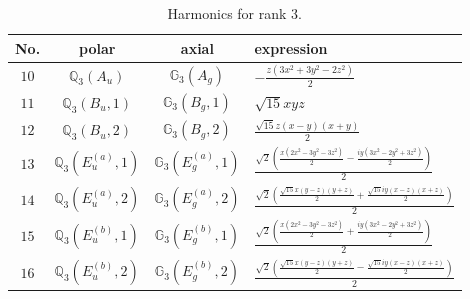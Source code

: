 \documentclass[fleqn,8pt,landscape]{jsarticle}
\begin{document}
\begin{table}[ht!]
\begin{center}
\caption{Harmonics for rank 3.}
\renewcommand{\arraystretch}{1.3}
\begin{tabular}{cccl} \hline \hline
No. & polar & axial & expression \\ \hline
$ 10 $ & $ \mathbb{Q}_{3}(A_{u}) $ & $ \mathbb{G}_{3}(A_{g}) $ & $ - \frac{z \left(3 x^{2} + 3 y^{2} - 2 z^{2}\right)}{2} $ \\
$ 11 $ & $ \mathbb{Q}_{3}(B_{u},1) $ & $ \mathbb{G}_{3}(B_{g},1) $ & $ \sqrt{15} x y z $ \\
$ 12 $ & $ \mathbb{Q}_{3}(B_{u},2) $ & $ \mathbb{G}_{3}(B_{g},2) $ & $ \frac{\sqrt{15} z \left(x - y\right) \left(x + y\right)}{2} $ \\
$ 13 $ & $ \mathbb{Q}_{3}(E_{u}^{(a)},1) $ & $ \mathbb{G}_{3}(E_{g}^{(a)},1) $ & $ \frac{\sqrt{2} \left(\frac{x \left(2 x^{2} - 3 y^{2} - 3 z^{2}\right)}{2} - \frac{i y \left(3 x^{2} - 2 y^{2} + 3 z^{2}\right)}{2}\right)}{2} $ \\
$ 14 $ & $ \mathbb{Q}_{3}(E_{u}^{(a)},2) $ & $ \mathbb{G}_{3}(E_{g}^{(a)},2) $ & $ \frac{\sqrt{2} \left(\frac{\sqrt{15} x \left(y - z\right) \left(y + z\right)}{2} + \frac{\sqrt{15} i y \left(x - z\right) \left(x + z\right)}{2}\right)}{2} $ \\
$ 15 $ & $ \mathbb{Q}_{3}(E_{u}^{(b)},1) $ & $ \mathbb{G}_{3}(E_{g}^{(b)},1) $ & $ \frac{\sqrt{2} \left(\frac{x \left(2 x^{2} - 3 y^{2} - 3 z^{2}\right)}{2} + \frac{i y \left(3 x^{2} - 2 y^{2} + 3 z^{2}\right)}{2}\right)}{2} $ \\
$ 16 $ & $ \mathbb{Q}_{3}(E_{u}^{(b)},2) $ & $ \mathbb{G}_{3}(E_{g}^{(b)},2) $ & $ \frac{\sqrt{2} \left(\frac{\sqrt{15} x \left(y - z\right) \left(y + z\right)}{2} - \frac{\sqrt{15} i y \left(x - z\right) \left(x + z\right)}{2}\right)}{2} $ \\
 \hline \hline
\end{tabular}
\end{center}
\end{table}
\end{document}
